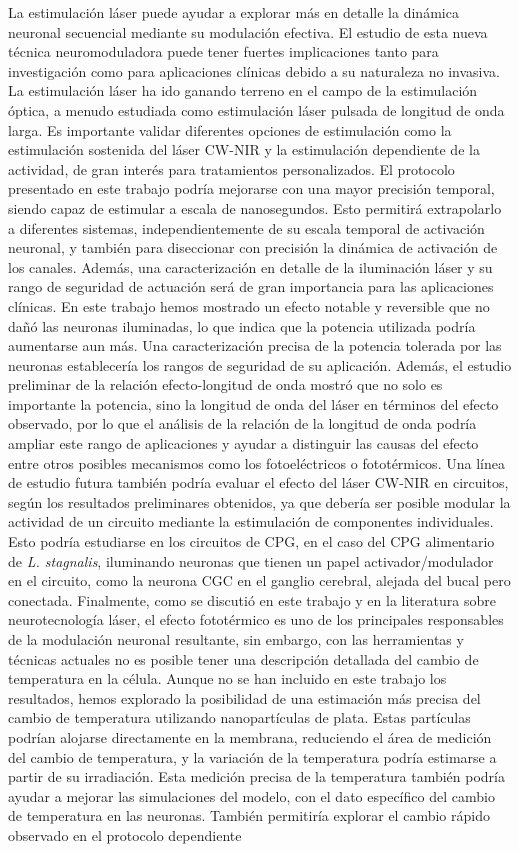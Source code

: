 La estimulación láser puede ayudar a explorar más en detalle la dinámica neuronal secuencial mediante su modulación efectiva. El estudio de esta nueva técnica neuromoduladora puede tener fuertes implicaciones tanto para investigación como para aplicaciones clínicas debido a su naturaleza no invasiva. La estimulación láser ha ido ganando terreno en el campo de la estimulación óptica, a menudo estudiada como estimulación láser pulsada de longitud de onda larga. Es importante validar diferentes opciones de estimulación como la estimulación sostenida del láser CW-NIR y la estimulación dependiente de la actividad, de gran interés para tratamientos personalizados. El protocolo presentado en este trabajo podría mejorarse con una mayor precisión temporal, siendo capaz de estimular a escala de nanosegundos. Esto permitirá extrapolarlo a diferentes sistemas, independientemente de su escala temporal de activación neuronal, y también para diseccionar con precisión la dinámica de activación de los canales. Además, una caracterización en detalle de la iluminación láser y su rango de seguridad de actuación será de gran importancia para las aplicaciones clínicas. En este trabajo hemos mostrado un efecto notable y reversible que no dañó las neuronas iluminadas, lo que indica que la potencia utilizada podría aumentarse aun más. Una caracterización precisa de la potencia tolerada por las neuronas establecería los rangos de seguridad de su aplicación. Además, el estudio preliminar de la relación efecto-longitud de onda mostró que no solo es importante la potencia, sino la longitud de onda del láser en términos del efecto observado, por lo que el análisis de la relación de la longitud de onda podría ampliar este rango de aplicaciones y ayudar a distinguir las causas del efecto entre otros posibles mecanismos como los fotoeléctricos o fototérmicos. Una línea de estudio futura también podría evaluar el efecto del láser CW-NIR en circuitos, según los resultados preliminares obtenidos, ya que debería ser posible modular la actividad de un circuito mediante la estimulación de componentes individuales. Esto podría estudiarse en los circuitos de CPG, en el caso del CPG alimentario de \textit{L. stagnalis}, iluminando neuronas que tienen un papel activador/modulador en el circuito, como la neurona CGC en el ganglio cerebral, alejada del bucal pero conectada. Finalmente, como se discutió en este trabajo y en la literatura sobre neurotecnología láser, el efecto fototérmico es uno de los principales responsables de la modulación neuronal resultante, sin embargo, con las herramientas y técnicas actuales no es posible tener una descripción detallada del cambio de temperatura en la célula. Aunque no se han incluido en este trabajo los resultados, hemos explorado la posibilidad de una estimación más precisa del cambio de temperatura utilizando nanopartículas de plata. Estas partículas podrían alojarse directamente en la membrana, reduciendo el área de medición del cambio de temperatura, y la variación de la temperatura podría estimarse a partir de su irradiación. Esta medición precisa de la temperatura también podría ayudar a mejorar las simulaciones del modelo, con el dato específico del cambio de temperatura en las neuronas. También permitiría explorar el cambio rápido observado en el protocolo dependiente 